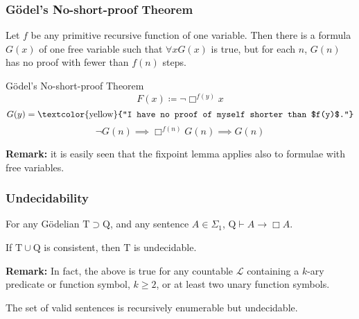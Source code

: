 \documentclass[UTF8,aspectratio=43,11pt,colorlinks,compress,openany]{beamer}%
\begin{document}
\begin{frame}\frametitle{G\"odel's No-short-proof Theorem}
\setlength\abovedisplayskip{0pt}
\setlength\belowdisplayskip{0pt}\vspace{-1ex}
	\begin{theorem}
		Let $f$ be any primitive recursive function of one variable. Then there is a formula $G(x)$ of one free variable such that $\forall x G(x)$ is true, but for each $n$, $G(n)$ has no proof with fewer than $f(n)$ steps.
	\end{theorem}
	\begin{block}{G\"odel's No-short-proof Theorem}
		\[F(x)\coloneqq \neg\Box ^{f(y)} x\]
		\[G(y)=\text{\textcolor{yellow}{``I have no proof of myself shorter than $f(y)$.''}}\]	
		\[\neg G(n)\implies\Box ^{f(n)} G(n)\implies G(n)\]
	\end{block}
	\textbf{Remark:} it is easily seen that the fixpoint lemma applies also to formulae with free variables.
	\begin{center}
	\end{center}
\end{frame}

\begin{frame}\frametitle{Undecidability}
\setlength\abovedisplayskip{0pt}
\setlength\belowdisplayskip{0pt}
	\begin{center}
	\end{center}
	\begin{theorem}
		For any G\"odelian $\mathrm{T}\supset \mathrm{Q}$, and any sentence $A\in\Sigma_1$, $\mathrm{Q}\vdash A\to\Box A$.
	\end{theorem}
	\begin{theorem}
		If $\mathrm{T}\cup \mathrm{Q}$ is consistent, then $\mathrm{T}$ is undecidable.
	\end{theorem}
	\textbf{Remark:} In fact, the above is true for any countable $\mathscr{L}$ containing a $k$-ary predicate or function symbol, $k\geq 2$, or at least two unary function symbols.
	\begin{center}
	\end{center}
	\begin{theorem}
		The set of valid sentences is recursively enumerable but undecidable.
	\end{theorem}
\end{frame}
\end{document}
